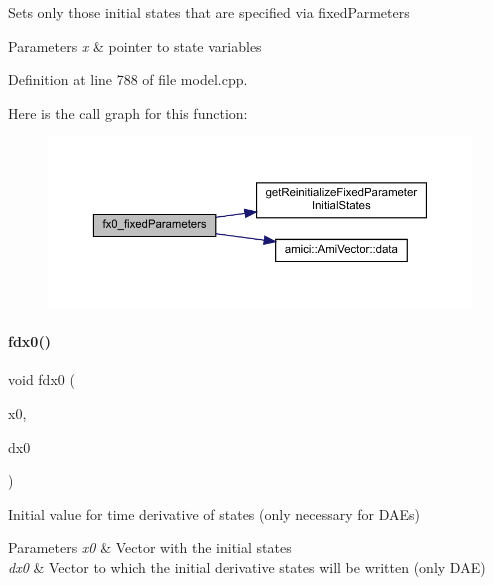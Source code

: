 Sets only those initial states that are specified via fixed\+Parmeters 
\begin{DoxyParams}{Parameters}
{\em x} & pointer to state variables \\
\hline
\end{DoxyParams}


Definition at line 788 of file model.\+cpp.

Here is the call graph for this function\+:
\nopagebreak
\begin{figure}[H]
\begin{center}
\leavevmode
\includegraphics[width=350pt]{classamici_1_1_model_ae517574d2a7c504c388438a08a1aed38_cgraph}
\end{center}
\end{figure}
\mbox{\label{classamici_1_1_model_a8c3a1647a75581d9e2fc5de106d87a0d}} 
\paragraph{\texorpdfstring{fdx0()}{fdx0()}}
{\footnotesize\ttfamily void fdx0 (\begin{DoxyParamCaption}\item[{\mbox{\hyperlink{classamici_1_1_ami_vector}{Ami\+Vector}} $\ast$}]{x0,  }\item[{\mbox{\hyperlink{classamici_1_1_ami_vector}{Ami\+Vector}} $\ast$}]{dx0 }\end{DoxyParamCaption})\hspace{0.3cm}{\ttfamily [virtual]}}

Initial value for time derivative of states (only necessary for D\+A\+Es) 
\begin{DoxyParams}{Parameters}
{\em x0} & Vector with the initial states \\
\hline
{\em dx0} & Vector to which the initial derivative states will be written (only D\+AE) \\
\hline
\end{DoxyParams}


